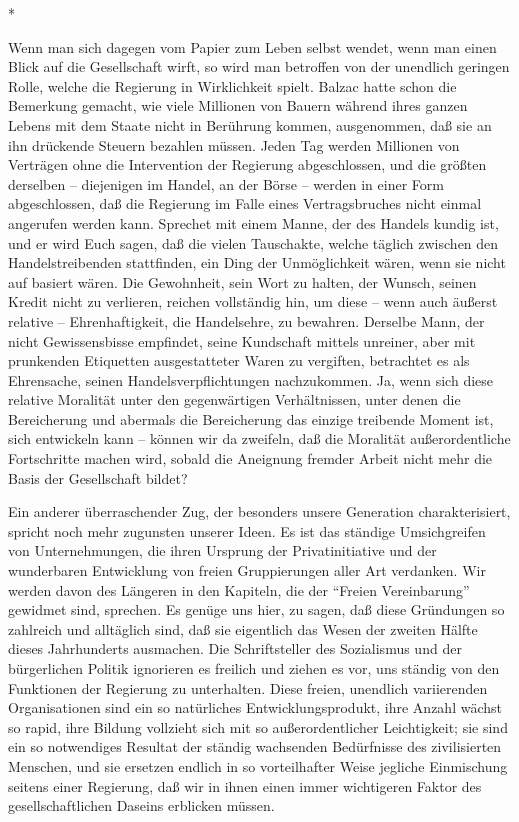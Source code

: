 \documentclass{scrbook}
\begin{document}
\begin{center}*\end{center}

Wenn man sich dagegen vom Papier zum Leben selbst wendet, wenn man einen Blick auf die Gesellschaft wirft, so wird man betroffen von der unendlich geringen Rolle, welche die Regierung in Wirklichkeit spielt. Balzac hatte schon die Bemerkung gemacht, wie viele Millionen von Bauern während ihres ganzen Lebens mit dem Staate nicht in Berührung kommen, ausgenommen, daß sie an ihn drückende Steuern bezahlen müssen. Jeden Tag werden Millionen von Verträgen ohne die Intervention der Regierung abgeschlossen, und die größten derselben – diejenigen im Handel, an der Börse – werden in einer Form abgeschlossen, daß die Regierung im Falle eines Vertragsbruches nicht einmal angerufen werden kann. Sprechet mit einem Manne, der des Handels kundig ist, und er wird Euch sagen, daß die vielen Tauschakte, welche täglich zwischen den Handelstreibenden stattfinden, ein Ding der Unmöglichkeit wären, wenn sie nicht auf  basiert wären. Die Gewohnheit, sein Wort zu halten, der Wunsch, seinen Kredit nicht zu verlieren, reichen vollständig hin, um diese – wenn auch äußerst relative – Ehrenhaftigkeit, die Handelsehre, zu bewahren. Derselbe Mann, der nicht Gewissensbisse empfindet, seine Kundschaft mittels unreiner, aber mit prunkenden Etiquetten ausgestatteter Waren zu vergiften, betrachtet es als Ehrensache, seinen Handelsverpflichtungen nachzukommen. Ja, wenn sich diese relative Moralität unter den gegenwärtigen Verhältnissen, unter denen die Bereicherung und abermals die Bereicherung das einzige treibende Moment ist, sich entwickeln kann – können wir da zweifeln, daß die Moralität außerordentliche Fortschritte machen wird, sobald die Aneignung fremder Arbeit nicht mehr die Basis der Gesellschaft bildet?

Ein anderer überraschender Zug, der besonders unsere Generation charakterisiert, spricht noch mehr zugunsten unserer Ideen. Es ist das ständige Umsichgreifen von Unternehmungen, die ihren Ursprung der Privatinitiative und der wunderbaren Entwicklung von freien Gruppierungen aller Art verdanken. Wir werden davon des Längeren in den Kapiteln, die der ``Freien Vereinbarung'' gewidmet sind, sprechen. Es genüge uns hier, zu sagen, daß diese Gründungen so zahlreich und alltäglich sind, daß sie eigentlich das Wesen der zweiten Hälfte dieses Jahrhunderts ausmachen. Die Schriftsteller des Sozialismus und der bürgerlichen Politik ignorieren es freilich und ziehen es vor, uns ständig von den Funktionen der Regierung zu unterhalten. Diese freien, unendlich variierenden Organisationen sind ein so natürliches Entwicklungsprodukt, ihre Anzahl wächst so rapid, ihre Bildung vollzieht sich mit so außerordentlicher Leichtigkeit; sie sind ein so notwendiges Resultat der ständig wachsenden Bedürfnisse des zivilisierten Menschen, und sie ersetzen endlich in so vorteilhafter Weise jegliche Einmischung seitens einer Regierung, daß wir in ihnen einen immer wichtigeren Faktor des gesellschaftlichen Daseins erblicken müssen.
\end{document}

